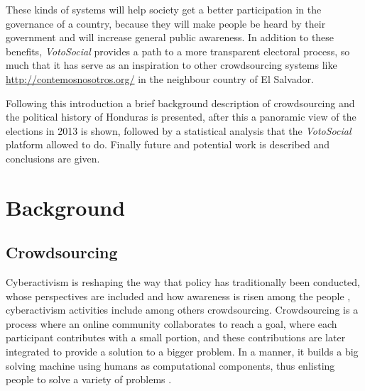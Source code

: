 \documentclass[letterpaper,10pt]{article}
\begin{document}
These kinds of systems will help society get a better participation in the governance of a country, because they will make people be heard by their government and will increase general public awareness. In addition to these benefits, \textit{VotoSocial} provides a path to a more transparent electoral process, so much that it has serve as an inspiration to other crowdsourcing systems like \url{http://contemosnosotros.org/} in the neighbour country of El Salvador. 

Following this introduction a brief background description of crowdsourcing and the political history of Honduras is presented, after this a panoramic view of the elections in 2013 is shown, followed by a statistical analysis that the \textit{VotoSocial} platform allowed to do. Finally future and potential work is described and conclusions are given.


\section{Background}

\subsection{Crowdsourcing}

Cyberactivism is reshaping the way that policy has traditionally been conducted, whose perspectives are included and how awareness is risen among the people \citep{milan2013}, cyberactivism activities include among others crowdsourcing. Crowdsourcing is a process where an online community collaborates to reach a goal, where each participant contributes with a small portion, and these contributions are later integrated to provide a solution to a bigger problem. In a manner, it builds a big solving machine using humans as computational components, thus enlisting people to solve a variety of problems \citep{doan2011}.
\end{document}
